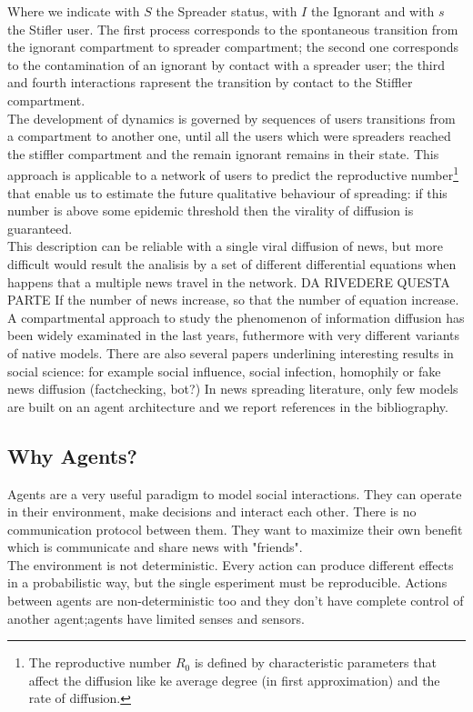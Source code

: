 \documentclass[11pt]{article} %
\begin{document}
Where we indicate with $S$ the Spreader status, with $I$ the Ignorant and with $s$ the Stifler user. 
The first process corresponds to the spontaneous transition from the ignorant compartment to spreader compartment;
 the second one corresponds to the contamination of an ignorant by contact with a spreader user; 
the third and fourth interactions rapresent the transition by contact to the Stiffler compartment.  \\
The development of dynamics is governed by sequences of users transitions from a compartment to another one, until all the users which were spreaders reached the stiffler compartment and the remain ignorant remains in their state.
This approach is applicable to a network of users to predict the reproductive 
number\footnote{The reproductive number $R_{0}$ is defined by characteristic parameters that affect the diffusion like ke average degree (in first approximation) and the rate of diffusion. } 
that enable us to estimate the future qualitative behaviour of spreading: 
if this number is above some epidemic threshold then the virality of diffusion is guaranteed.\\
This description can be reliable with a single viral diffusion of news, but more difficult would result the analisis by a set of different differential equations when happens that a 
multiple news travel in the network.  DA RIVEDERE QUESTA PARTE
 If the number of news increase, so that the number of equation increase.\\
 A compartmental approach to study the phenomenon of information diffusion has been widely examinated in the last years, futhermore with very different variants of native models.
There are also several papers underlining interesting results in social science: for example social influence, social infection, homophily or fake news diffusion (factchecking, bot?)
 In news spreading literature, only few models are built on an agent architecture and we report references in the bibliography.


\subsection{Why Agents?}
Agents are a very useful paradigm to model social interactions. 
They can operate in their environment, make decisions and interact each other.
There is no communication protocol between them. They want to maximize their own benefit which is
communicate and share news with "friends". \\
The environment is not deterministic. 
Every action can produce different effects in a probabilistic way, but the single esperiment must be reproducible.
Actions between agents are non-deterministic too and they don't have complete control of another
agent;agents have limited senses and sensors.
\\
\end{document}
